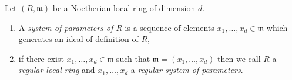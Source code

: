 \begin{definition}
\label{definition-regular-local}
Let $(R, \mathfrak m)$ be a Noetherian local ring of dimension $d$.
\begin{enumerate}
\item A {\it system of parameters of $R$} is a sequence of elements
$x_1, \ldots, x_d \in \mathfrak m$ which generates an ideal of
definition of $R$,
\item if there exist $x_1, \ldots, x_d \in \mathfrak m$
such that $\mathfrak m = (x_1, \ldots, x_d)$ then we call
$R$ a {\it regular local ring} and $x_1, \ldots, x_d$ a {\it regular
system of parameters}.
\end{enumerate}
\end{definition}